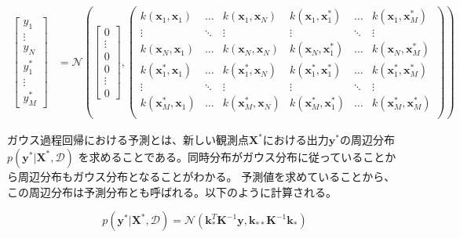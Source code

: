 \begin{align}
\begin{bmatrix}
	y_{1} \\
	\vdots \\
	y_{N} \\
	y_{1}^* \\
	\vdots \\
	y_{M}^*
\end{bmatrix}
&= \mathcal{N}(
   	\begin{bmatrix}
	  0 \\
	  \vdots \\
	  0 \\
	  0 \\
	  \vdots \\
      0
   	\end{bmatrix},
	\begin{pmatrix}
		k(\boldsymbol{x}_{1}, \boldsymbol{x}_{1}) & \dots & k(\boldsymbol{x}_{1}, \boldsymbol{x}_{N}) & k(\boldsymbol{x}_{1}, \boldsymbol{x}_{1}^*) & \dots & k(\boldsymbol{x}_{1}, \boldsymbol{x}_{M}^*) \\
		\vdots & \ddots & \vdots & \vdots & \ddots & \vdots \\
		k(\boldsymbol{x}_{N}, \boldsymbol{x}_{1}) & \dots & k(\boldsymbol{x}_{N}, \boldsymbol{x}_{N}) & k(\boldsymbol{x}_{N}, \boldsymbol{x}_{1}^*) & \dots & k(\boldsymbol{x}_{N}, \boldsymbol{x}_{M}^*) \\
		k(\boldsymbol{x}_{1}^*, \boldsymbol{x}_{1}) & \dots & k(\boldsymbol{x}_{1}^*, \boldsymbol{x}_{N}) & k(\boldsymbol{x}_{1}^*, \boldsymbol{x}_{1}^*) & \dots & k(\boldsymbol{x}_{1}^*, \boldsymbol{x}_{M}^*) \\
		\vdots & \ddots & \vdots & \vdots & \ddots & \vdots \\
		k(\boldsymbol{x}_{M}^*, \boldsymbol{x}_{1}) & \dots & k(\boldsymbol{x}_{M}^*, \boldsymbol{x}_{N}) & k(\boldsymbol{x}_{M}^*, \boldsymbol{x}_{1}^*) & \dots & k(\boldsymbol{x}_{M}^*, \boldsymbol{x}_{M}^*) \\
    \end{pmatrix}
  )
\end{align}

ガウス過程回帰における予測とは、新しい観測点$\boldsymbol{X}^*$における出力$\boldsymbol{y}^*$の周辺分布$p(\boldsymbol{y}^*|\boldsymbol{X}^*, \mathcal{D})$
を求めることである。同時分布がガウス分布に従っていることから周辺分布もガウス分布となることがわかる。
予測値を求めていることから、この周辺分布は予測分布とも呼ばれる。以下のように計算される。

\begin{equation}
p(\boldsymbol{y}^*|\boldsymbol{X}^*, \mathcal{D}) = \mathcal{N}(\boldsymbol{k}_{*}^T\boldsymbol{K}^{-1}\boldsymbol{y}, \boldsymbol{k}_{**}\boldsymbol{K}^{-1}\boldsymbol{k}_{*})
\end{equation}

